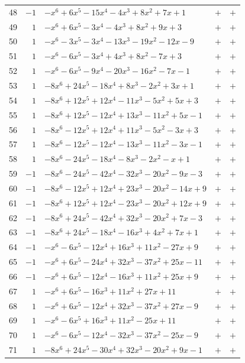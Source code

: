 \documentclass[11pt]{article}
\begin{document}
\begin{longtable}{@{}rrlcc@{}}
48 & $-1$ & $-x^{6}+6x^{5}-15x^{4}-4x^{3}+8x^{2}+7x+1$ & $+$ & $+$\\
49 & $1$ & $-x^{6}+6x^{5}-3x^{4}-4x^{3}+8x^{2}+9x+3$ & $+$ & $+$\\
50 & $1$ & $-x^{6}-3x^{5}-3x^{4}-13x^{3}-19x^{2}-12x-9$ & $+$ & $+$\\
51 & $1$ & $-x^{6}-6x^{5}-3x^{4}+4x^{3}+8x^{2}-7x+3$ & $+$ & $+$\\
52 & $1$ & $-x^{6}-6x^{5}-9x^{4}-20x^{3}-16x^{2}-7x-1$ & $+$ & $+$\\
53 & $1$ & $-8x^{6}+24x^{5}-18x^{4}+8x^{3}-2x^{2}+3x+1$ & $+$ & $+$\\
54 & $1$ & $-8x^{6}+12x^{5}+12x^{4}-11x^{3}-5x^{2}+5x+3$ & $+$ & $+$\\
55 & $1$ & $-8x^{6}+12x^{5}-12x^{4}+13x^{3}-11x^{2}+5x-1$ & $+$ & $+$\\
56 & $1$ & $-8x^{6}-12x^{5}+12x^{4}+11x^{3}-5x^{2}-3x+3$ & $+$ & $+$\\
57 & $1$ & $-8x^{6}-12x^{5}-12x^{4}-13x^{3}-11x^{2}-3x-1$ & $+$ & $+$\\
58 & $1$ & $-8x^{6}-24x^{5}-18x^{4}-8x^{3}-2x^{2}-x+1$ & $+$ & $+$\\
59 & $-1$ & $-8x^{6}-24x^{5}-42x^{4}-32x^{3}-20x^{2}-9x-3$ & $+$ & $+$\\
60 & $-1$ & $-8x^{6}-12x^{5}+12x^{4}+23x^{3}-20x^{2}-14x+9$ & $+$ & $+$\\
61 & $-1$ & $-8x^{6}+12x^{5}+12x^{4}-23x^{3}-20x^{2}+12x+9$ & $+$ & $+$\\
62 & $-1$ & $-8x^{6}+24x^{5}-42x^{4}+32x^{3}-20x^{2}+7x-3$ & $+$ & $+$\\
63 & $-1$ & $-8x^{6}+24x^{5}-18x^{4}-16x^{3}+4x^{2}+7x+1$ & $+$ & $+$\\
64 & $-1$ & $-x^{6}-6x^{5}-12x^{4}+16x^{3}+11x^{2}-27x+9$ & $+$ & $+$\\
65 & $-1$ & $-x^{6}+6x^{5}-24x^{4}+32x^{3}-37x^{2}+25x-11$ & $+$ & $+$\\
66 & $-1$ & $-x^{6}+6x^{5}-12x^{4}-16x^{3}+11x^{2}+25x+9$ & $+$ & $+$\\
67 & $1$ & $-x^{6}+6x^{5}-16x^{3}+11x^{2}+27x+11$ & $+$ & $+$\\
68 & $1$ & $-x^{6}+6x^{5}-12x^{4}+32x^{3}-37x^{2}+27x-9$ & $+$ & $+$\\
69 & $1$ & $-x^{6}-6x^{5}+16x^{3}+11x^{2}-25x+11$ & $+$ & $+$\\
70 & $1$ & $-x^{6}-6x^{5}-12x^{4}-32x^{3}-37x^{2}-25x-9$ & $+$ & $+$\\
71 & $1$ & $-8x^{6}+24x^{5}-30x^{4}+32x^{3}-20x^{2}+9x-1$ & $+$ & $+$\\

\end{longtable}
\end{document}

